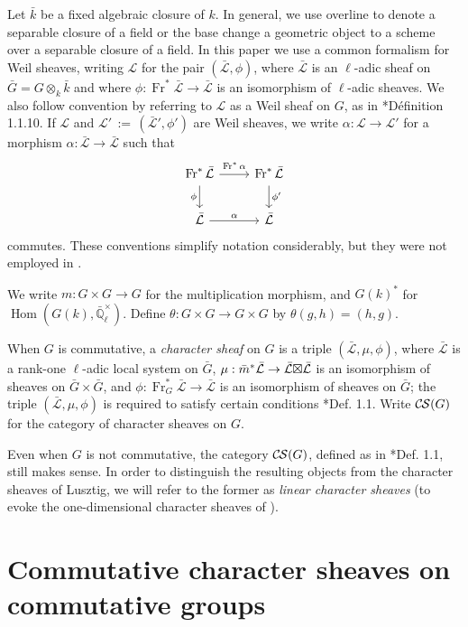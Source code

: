 \documentclass[10pt]{amsart}
\theoremstyle{plain}
\theoremstyle{definition}
\newcommand{\EE}{\mathbb{\bar Q}_\ell}
\newcommand{\bFq}{\bar{k}}
\newcommand{\Fq}{k}
\newcommand{\EEx}{\EE^\times}
\newcommand{\Frob}[1]{\operatorname{Fr}_{#1}}
\DeclareMathOperator{\Hom}{Hom}
\newcommand{\ceq}{{\, :=\, }}
\newcommand{\cs}[1]{{\mathcal{#1}}}
\newcommand{\gcs}[1]{{\mathcal{\bar #1}}}
\newcommand{\CS}{{\mathcal{C\hskip-0.8pt S}}}
\newcommand{\bm}{\bar{m}}
\newcommand{\bG}{\bar{G}}
\newcommand{\tight}[3]{\hspace{-#1pt}{#2}\hspace{-#3pt}}
\newcommand{\LxL}{\text{$\gcs{L} \tight{0}{\boxtimes}{0} \gcs{L}$}}
\begin{document}
Let $\bFq$ be a fixed algebraic closure of $\Fq$. 
In general, we use overline to denote a separable closure of a field or the base change a geometric object to a scheme over a separable closure of a field.
%
In this paper we use a common formalism for Weil sheaves, writing $\cs{L}$ for the pair $(\gcs{L},\phi)$, where $\gcs{L}$ is an $\ell$-adic sheaf on $\bG = G\otimes_{\Fq} \bFq$  and where $\phi : \Frob{}^*\gcs{L} \to \gcs{L}$ is an isomorphism of $\ell$-adic sheaves. 
We also follow convention by referring to $\cs{L}$  as a Weil sheaf on $G$, as in \cite{Deligne:Weil}*{D\'efinition 1.1.10}.
If $\cs{L}$ and $\cs{L}' \ceq (\gcs{L}', \phi')$ are Weil sheaves, we write $\alpha : \cs{L} \to \cs{L}'$ for a morphism $\alpha : \gcs{L} \to \gcs{L}$ such that 
\[
\begin{tikzcd}
\Frob{}^* \gcs{L} \arrow{d}[swap]{\phi} \arrow{r}{\Frob{}^*\alpha} &  \Frob{}^* \gcs{L} \arrow{d}{\phi'}\\
\gcs{L} \arrow{r}{\alpha} & \gcs{L}
\end{tikzcd}
\]
commutes.  
These conventions simplify notation considerably, but they were not employed in \cite{cunningham-roe:13a}.

We write $m : G \times G \to G$ for the multiplication morphism, and $G(k)^*$ for $\Hom(G(k), \EEx)$.
Define $\theta : G\times G \to G\times G$ by $\theta(g,h) = (h,g)$.

When $G$ is commutative, a \emph{character sheaf} on $G$ is a triple $(\gcs{L}, \mu, \phi)$,
where $\gcs{L}$ is a rank-one $\ell$-adic local system on $\bG$, 
$\mu : \bm^* \gcs{L} \to \LxL$ is an isomorphism
of sheaves on $\bG \times \bG$, 
and $\phi : \Frob{G}^* \gcs{L} \to \gcs{L}$ is an isomorphism of sheaves on $\bG$;
the triple $(\gcs{L}, \mu, \phi)$ is required to satisfy certain conditions \cite{cunningham-roe:13a}*{Def. 1.1}.
Write $\CS(G)$ for the category of character sheaves on $G$.

Even when $G$ is not commutative, the category $\CS(G)$, defined as in \cite{cunningham-roe:13a}*{Def. 1.1},
still makes sense.  In order to distinguish the resulting objects from
the character sheaves of Lusztig, we will refer to the former as \emph{linear character sheaves}
(to evoke the one-dimensional character sheaves of \cite{kamgarpour:09a}).

\section{Commutative character sheaves on commutative groups}\label{sec:comcom}
\end{document}
